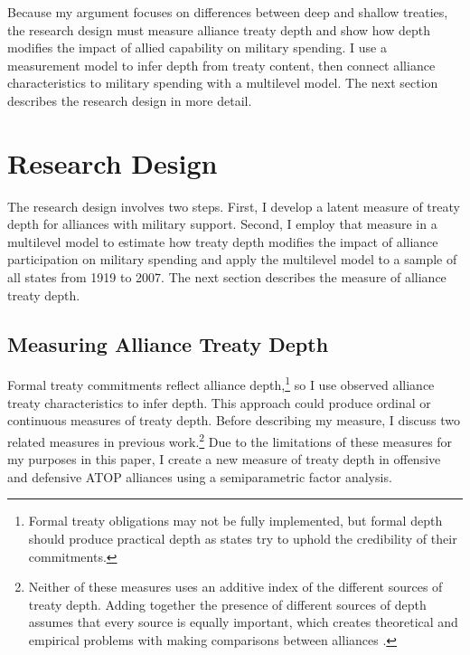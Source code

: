 \documentclass[12pt]{article}
\begin{document}
Because my argument focuses on differences between deep and shallow treaties, the research design must measure alliance treaty depth and show how depth modifies the impact of allied capability on military spending.  
I use a measurement model to infer depth from treaty content, then connect alliance characteristics to military spending with a multilevel model. 
The next section describes the research design in more detail. 



\section{Research Design} 


The research design involves two steps. 
First, I develop a latent measure of treaty depth for alliances with military support. 
Second, I employ that measure in a multilevel model to estimate how treaty depth modifies the impact of alliance participation on military spending and apply the multilevel model to a sample of all states from 1919 to 2007. 
The next section describes the measure of alliance treaty depth. 


\subsection{Measuring Alliance Treaty Depth} 


Formal treaty commitments reflect alliance depth,\footnote{Formal treaty obligations may not be fully implemented, but formal depth should produce practical depth as states try to uphold the credibility of their commitments.} so I use observed alliance treaty characteristics to infer depth. 
This approach could produce ordinal or continuous measures of treaty depth.
Before describing my measure, I discuss two related measures in previous work.\footnote{Neither of these measures uses an additive index of the different sources of treaty depth. Adding together the presence of different sources of depth assumes that every source is equally important, which creates theoretical and empirical problems with making comparisons between alliances \citep[pg. 876]{BensonClinton2016}.} 
Due to the limitations of these measures for my purposes in this paper, I create a new measure of treaty depth in offensive and defensive ATOP alliances using a semiparametric factor analysis. 
\end{document}
